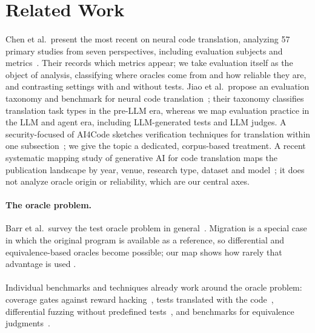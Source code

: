 \section{Related Work}
\label{sec:related}

\paragraph{} Chen et al.\ present the most recent  on neural code translation, analyzing 57 primary studies from seven perspectives, including evaluation subjects and metrics~\cite{nctslr}. Their  records which metrics appear; we take evaluation itself as the object of analysis, classifying where oracles come from and how reliable they are, and contrasting settings with and without tests. Jiao et al.\ propose an evaluation taxonomy and benchmark for neural code translation~\cite{jiao23}; their taxonomy classifies translation task types in the pre-LLM era, whereas we map evaluation practice in the LLM and agent era, including LLM-generated tests and LLM judges. A security-focused  of AI4Code sketches verification techniques for translation within one subsection~\cite{ai4codesok}; we give the topic a dedicated, corpus-based treatment. A recent systematic mapping study of generative AI for code translation maps the publication landscape by year, venue, research type, dataset and model~\cite{genaisms}; it does not analyze oracle origin or reliability, which are our central axes.

\paragraph{The oracle problem.} Barr et al.\ survey the test oracle problem in general~\cite{barr}. Migration is a special case in which the original program is available as a reference, so differential and equivalence-based oracles become possible; our map shows how rarely that advantage is used  .

\paragraph{} Individual benchmarks and techniques already work around the oracle problem: coverage gates against reward hacking~\cite{freshbrew}, tests translated with the code~\cite{alphatrans}, differential fuzzing without predefined tests~\cite{dristi}, and benchmarks for equivalence judgments~\cite{polyhuman}. 
